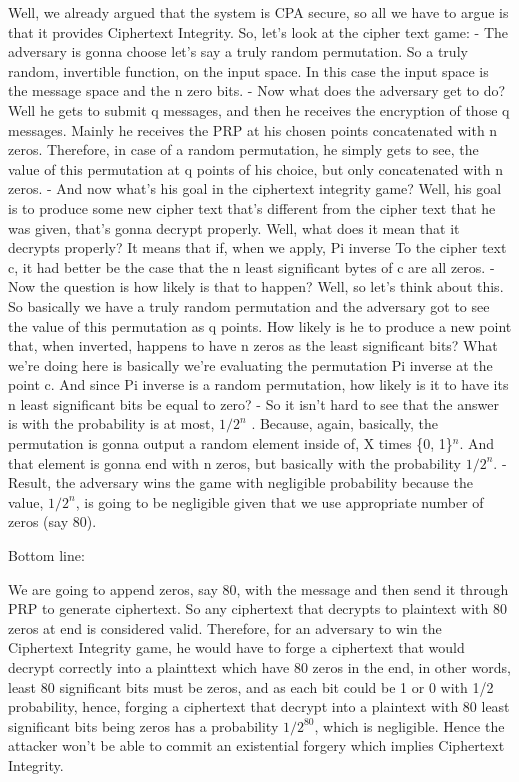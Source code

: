 \documentclass[11pt]{article}
\begin{document}
Well, we already argued that the system is CPA secure, so all we have to
argue is that it provides Ciphertext Integrity. So, let's look at the
cipher text game: - The adversary is gonna choose let's say a truly
random permutation. So a truly random, invertible function, on the input
space. In this case the input space is the message space and the n zero
bits. - Now what does the adversary get to do? Well he gets to submit q
messages, and then he receives the encryption of those q messages.
Mainly he receives the PRP at his chosen points concatenated with n
zeros. Therefore, in case of a random permutation, he simply gets to
see, the value of this permutation at q points of his choice, but only
concatenated with n zeros. - And now what's his goal in the ciphertext
integrity game? Well, his goal is to produce some new cipher text that's
different from the cipher text that he was given, that's gonna decrypt
properly. Well, what does it mean that it decrypts properly? It means
that if, when we apply, Pi inverse To the cipher text c, it had better
be the case that the n least significant bytes of c are all zeros. - Now
the question is how likely is that to happen? Well, so let's think about
this. So basically we have a truly random permutation and the adversary
got to see the value of this permutation as q points. How likely is he
to produce a new point that, when inverted, happens to have n zeros as
the least significant bits? What we're doing here is basically we're
evaluating the permutation Pi inverse at the point c. And since Pi
inverse is a random permutation, how likely is it to have its n least
significant bits be equal to zero? - So it isn't hard to see that the
answer is with the probability is at most, \(1/2^{n}\) . Because, again,
basically, the permutation is gonna output a random element inside of, X
times \{0, 1\}\(^n\). And that element is gonna end with n zeros, but
basically with the probability \(1/2^{n}\). - Result, the adversary wins
the game with negligible probability because the value, \(1/2^{n}\), is
going to be negligible given that we use appropriate number of zeros
(say 80).

Bottom line:

We are going to append zeros, say 80, with the message and then send it
through PRP to generate ciphertext. So any ciphertext that decrypts to
plaintext with 80 zeros at end is considered valid. Therefore, for an
adversary to win the Ciphertext Integrity game, he would have to forge a
ciphertext that would decrypt correctly into a plainttext which have 80
zeros in the end, in other words, least 80 significant bits must be
zeros, and as each bit could be 1 or 0 with 1/2 probability, hence,
forging a ciphertext that decrypt into a plaintext with 80 least
significant bits being zeros has a probability \(1/2^{80}\), which is
negligible. Hence the attacker won't be able to commit an existential
forgery which implies Ciphertext Integrity.
\end{document}

